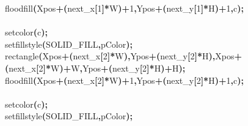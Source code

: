 \documentclass[a4paper, 10pt]{article}
\newcommand\SPC{\hspace*{0.6em}}
\newcommand{\CppAIdentifier}[1]{#1}
\newcommand{\CppANumber}[1]{\textcolor[rgb]{0.5,0,0.5}{#1}}
\newcommand{\CppASpace}[1]{\colorbox[rgb]{1,1,1}{#1}}
\newcommand{\CppASymbol}[1]{\textbf{\textcolor[rgb]{1,0,0}{#1}}}
\begin{document}
\begin{ttfamily}
\CppASpace{\SPC }\CppAIdentifier{floodfill}\CppASymbol{(}\CppAIdentifier{Xpos}\CppASymbol{+}\CppASymbol{(}\CppAIdentifier{next\_x}\CppASymbol{[}\CppANumber{1}\CppASymbol{]}\CppASymbol{*}\CppAIdentifier{W}\CppASymbol{)}\CppASymbol{+}\CppANumber{1}\CppASymbol{,}\CppAIdentifier{Ypos}\CppASymbol{+}\CppASymbol{(}\CppAIdentifier{next\_y}\CppASymbol{[}\CppANumber{1}\CppASymbol{]}\CppASymbol{*}\CppAIdentifier{H}\CppASymbol{)}\CppASymbol{+}\CppANumber{1}\CppASymbol{,}\CppAIdentifier{c}\CppASymbol{)}\CppASymbol{;}\\
\\
\CppASpace{\SPC }\CppAIdentifier{setcolor}\CppASymbol{(}\CppAIdentifier{c}\CppASymbol{)}\CppASymbol{;}\\
\CppASpace{\SPC }\CppAIdentifier{setfillstyle}\CppASymbol{(}\CppAIdentifier{SOLID\_FILL}\CppASymbol{,}\CppAIdentifier{pColor}\CppASymbol{)}\CppASymbol{;}\\
\CppASpace{\SPC }\CppAIdentifier{rectangle}\CppASymbol{(}\CppAIdentifier{Xpos}\CppASymbol{+}\CppASymbol{(}\CppAIdentifier{next\_x}\CppASymbol{[}\CppANumber{2}\CppASymbol{]}\CppASymbol{*}\CppAIdentifier{W}\CppASymbol{)}\CppASymbol{,}\CppAIdentifier{Ypos}\CppASymbol{+}\CppASymbol{(}\CppAIdentifier{next\_y}\CppASymbol{[}\CppANumber{2}\CppASymbol{]}\CppASymbol{*}\CppAIdentifier{H}\CppASymbol{)}\CppASymbol{,}\CppAIdentifier{Xpos}\CppASymbol{+}\CppASymbol{(}\CppAIdentifier{next\_x}\CppASymbol{[}\CppANumber{2}\CppASymbol{]}\CppASymbol{*}\CppAIdentifier{W}\CppASymbol{)}\CppASymbol{+}\CppAIdentifier{W}\CppASymbol{,}\CppAIdentifier{Ypos}\CppASymbol{+}\CppASymbol{(}\CppAIdentifier{next\_y}\CppASymbol{[}\CppANumber{2}\CppASymbol{]}\CppASymbol{*}\CppAIdentifier{H}\CppASymbol{)}\CppASymbol{+}\CppAIdentifier{H}\CppASymbol{)}\CppASymbol{;}\\
\CppASpace{\SPC }\CppAIdentifier{floodfill}\CppASymbol{(}\CppAIdentifier{Xpos}\CppASymbol{+}\CppASymbol{(}\CppAIdentifier{next\_x}\CppASymbol{[}\CppANumber{2}\CppASymbol{]}\CppASymbol{*}\CppAIdentifier{W}\CppASymbol{)}\CppASymbol{+}\CppANumber{1}\CppASymbol{,}\CppAIdentifier{Ypos}\CppASymbol{+}\CppASymbol{(}\CppAIdentifier{next\_y}\CppASymbol{[}\CppANumber{2}\CppASymbol{]}\CppASymbol{*}\CppAIdentifier{H}\CppASymbol{)}\CppASymbol{+}\CppANumber{1}\CppASymbol{,}\CppAIdentifier{c}\CppASymbol{)}\CppASymbol{;}\\
\\
\CppASpace{\SPC }\CppAIdentifier{setcolor}\CppASymbol{(}\CppAIdentifier{c}\CppASymbol{)}\CppASymbol{;}\\
\CppASpace{\SPC }\CppAIdentifier{setfillstyle}\CppASymbol{(}\CppAIdentifier{SOLID\_FILL}\CppASymbol{,}\CppAIdentifier{pColor}\CppASymbol{)}\CppASymbol{;}\\

\end{ttfamily}
\end{document}
